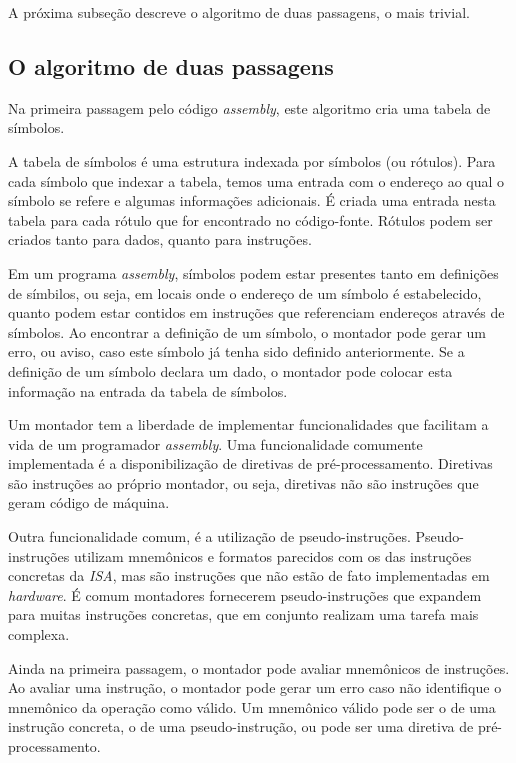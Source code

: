 A próxima subseção descreve o algoritmo de duas passagens, o mais trivial.

\subsection{O algoritmo de duas passagens}

Na primeira passagem pelo código \textit{assembly}, este algoritmo cria uma tabela de símbolos.

A tabela de símbolos é uma estrutura indexada por símbolos (ou rótulos). Para cada símbolo que indexar a tabela, temos uma entrada com o endereço ao qual o símbolo se refere e algumas informações adicionais. É criada uma entrada nesta tabela para cada rótulo que for encontrado no código-fonte. Rótulos podem ser criados tanto para dados, quanto para instruções.

Em um programa \textit{assembly}, símbolos podem estar presentes tanto em definições de símbilos, ou seja, em locais onde o endereço de um símbolo é estabelecido, quanto podem estar contidos em instruções que referenciam endereços através de símbolos. Ao encontrar a definição de um símbolo, o montador pode gerar um erro, ou aviso, caso este símbolo já tenha sido definido anteriormente. Se a definição de um símbolo declara um dado, o montador pode colocar esta informação na entrada da tabela de símbolos.

Um montador tem a liberdade de implementar funcionalidades que facilitam a vida de um programador \textit{assembly}. Uma funcionalidade comumente implementada é a disponibilização de diretivas de pré-processamento. Diretivas são instruções ao próprio montador, ou seja, diretivas não são instruções que geram código de máquina.

Outra funcionalidade comum, é a utilização de pseudo-instruções. Pseudo-instruções utilizam mnemônicos e formatos parecidos com os das instruções concretas da \textit{ISA}, mas são instruções que não estão de fato implementadas em \textit{hardware}. É comum montadores fornecerem pseudo-instruções que expandem para muitas instruções concretas, que em conjunto realizam uma tarefa mais complexa.

Ainda na primeira passagem, o montador pode avaliar mnemônicos de instruções. Ao avaliar uma instrução, o montador pode gerar um erro caso não identifique o mnemônico da operação como válido. Um mnemônico válido pode ser o de uma instrução concreta, o de uma pseudo-instrução, ou pode ser uma diretiva de pré-processamento.

